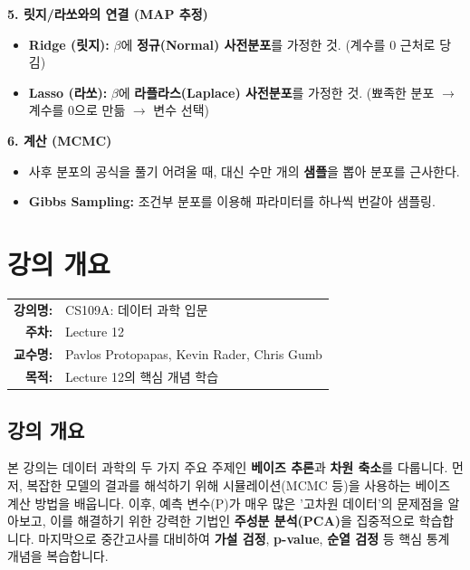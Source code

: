\documentclass[11pt,a4paper]{book}
\makeatletter
\theoremstyle{definition}
\newcommand{\metainfo}[4]{
\begin{tcolorbox}[
    colback=lightpurple,
    colframe=darkpurple,
    boxrule=1pt,
    arc=2mm,
    left=10pt,
    right=10pt,
    top=8pt,
    bottom=8pt
]
\begin{tabular}{@{}rl@{}}
\textbf{강의명:} & #1 \\[0.3em]
\textbf{주차:} & #2 \\[0.3em]
\textbf{교수명:} & #3 \\[0.3em]
\textbf{목적:} & \begin{minipage}[t]{0.75\textwidth}#4\end{minipage}
\end{tabular}
\end{tcolorbox}
}
\makeatother
\begin{document}
\begin{summarybox}
    \textbf{5. 릿지/라쏘와의 연결 (MAP 추정)}
    \begin{itemize}
        \item \textbf{Ridge (릿지):} $\beta$에 \textbf{정규(Normal) 사전분포}를 가정한 것. (계수를 0 근처로 당김)
        \item \textbf{Lasso (라쏘):} $\beta$에 \textbf{라플라스(Laplace) 사전분포}를 가정한 것. (뾰족한 분포 $\to$ 계수를 0으로 만듦 $\to$ 변수 선택)
    \end{itemize}
    
    \textbf{6. 계산 (MCMC)}
    \begin{itemize}
        \item 사후 분포의 공식을 풀기 어려울 때, 대신 수만 개의 \textbf{샘플}을 뽑아 분포를 근사한다.
        \item \textbf{Gibbs Sampling:} 조건부 분포를 이용해 파라미터를 하나씩 번갈아 샘플링.
    \end{itemize}
\end{summarybox}


\chapter{강의 개요}
\label{ch:lecture12}



\metainfo{CS109A: 데이터 과학 입문}{Lecture 12}{Pavlos Protopapas, Kevin Rader, Chris Gumb}{Lecture 12의 핵심 개념 학습}


\section{강의 개요}

\begin{summarybox}
본 강의는 데이터 과학의 두 가지 주요 주제인 \textbf{베이즈 추론}과 \textbf{차원 축소}를 다룹니다.
먼저, 복잡한 모델의 결과를 해석하기 위해 시뮬레이션(MCMC 등)을 사용하는 베이즈 계산 방법을 배웁니다.
이후, 예측 변수(P)가 매우 많은 '고차원 데이터'의 문제점을 알아보고, 이를 해결하기 위한 강력한 기법인 \textbf{주성분 분석(PCA)}을 집중적으로 학습합니다.
마지막으로 중간고사를 대비하여 \textbf{가설 검정}, \textbf{p-value}, \textbf{순열 검정} 등 핵심 통계 개념을 복습합니다.
\end{summarybox}
\end{document}

